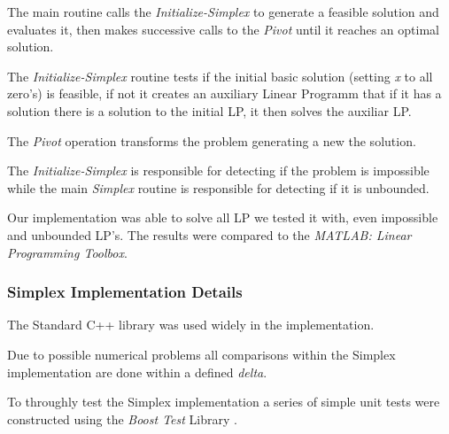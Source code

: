 The main routine calls the \emph{Initialize-Simplex} to generate a feasible solution and evaluates it, then makes successive calls to the \emph{Pivot} until it reaches an optimal solution.

The \emph{Initialize-Simplex} routine tests if the initial basic solution (setting \emph{x} to all zero's) is feasible, if not it creates an auxiliary Linear Programm that if it has a solution there is a solution to the initial LP, it then solves the auxiliar LP.

The \emph{Pivot} operation transforms the problem generating a new the solution.

The \emph{Initialize-Simplex} is responsible for detecting if the problem is impossible while the main \emph{Simplex} routine is responsible for detecting if it is unbounded.

Our implementation was able to solve all LP we tested it with, even impossible and unbounded LP's. The results were compared to the \emph{MATLAB: Linear Programming Toolbox}.

\subsubsection{Simplex Implementation Details}
\label{subs:SimplexImplementationDetails}

The Standard C++ library was used widely in the implementation. %

Due to possible numerical problems all comparisons within the Simplex implementation are done within a defined \emph{delta}.

To throughly test the Simplex implementation a series of simple unit tests were constructed using the \emph{Boost Test} Library \cite{BoostSite}.

